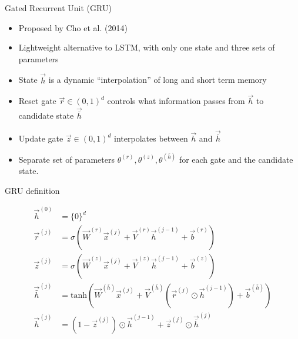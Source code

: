 \documentclass[11pt,compress,t,notes=noshow, xcolor=table]{beamer}
\begin{document}

\iffalse

\begin{vbframe}{Gated Recurrent Unit (GRU)}

\vfill

\begin{itemize}
	\item Proposed by Cho et al. (2014)
	\item Lightweight alternative to LSTM, with only one state and three sets of parameters
	\item State $\vec h$ is a dynamic ``interpolation'' of long and short term memory
	\item Reset gate $\vec r \in (0,1)^d$ controls what information passes from $\vec h$ to candidate state $\vec {\bar{h}}$
	\item Update gate $\vec z \in (0,1)^d$ interpolates between $\vec h$ and $\vec {\bar{h}}$
	\item Separate set of parameters $\theta^{(r)}, \theta^{(z)}, \theta^{(\bar{h})}$ for each gate and the candidate state.
\end{itemize}

\vfill

\end{vbframe}


\begin{vbframe}{GRU definition}

\vfill

$$
\begin{aligned}
\vec h^{(0)} & = \{0\}^d \\
\vec r^{(j)} & = \sigma(\vec W^{(r)} \vec x^{(j)} + \vec V^{(r)} \vec h^{(j-1)} + \vec b^{(r)}) \\
\vec z^{(j)} & = \sigma(\vec W^{(z)} \vec x^{(j)} + \vec V^{(z)} \vec h^{(j-1)} + \vec b^{(z)}) \\
\vec {\bar{h}}^{(j)} & = \mathrm{tanh}(\vec W^{(\bar{h})} \vec x^{(j)} + \vec V^{(\bar{h})} (\vec r^{(j)} \odot \vec h^{(j-1)}) + \vec b^{(\bar{h})}) \\
\vec h^{(j)} &= (1-\vec z^{(j)}) \odot \vec h^{(j-1)} + \vec z^{(j)} \odot \vec {\bar{h}}^{(j)} \\
\end{aligned}
$$

\vfill

\end{vbframe}
\end{document}

